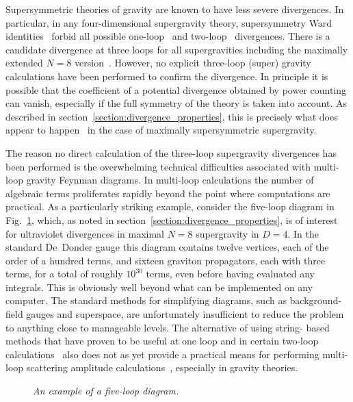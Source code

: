 \documentclass[12pt]{livrev}
\begin{document}
Supersymmetric theories of gravity are known to have less severe
divergences. In particular, in any four-dimensional supergravity
theory, supersymmetry Ward
identities~\cite{Grisaru77SWIA,Grisaru77SWIB} forbid all possible
one-loop~\cite{OneLoopSUGRA} and two-loop~\cite{Grisaru77,Tomboulis77}
divergences.  There is a candidate divergence at three loops for all
supergravities including the maximally extended $N=8$
version~\cite{Deser77,Howe81,KalloshNeight,Howe89}.  However, no
explicit three-loop (super) gravity calculations have been performed
to confirm the divergence.  In principle it is possible that the coefficient
of a potential divergence obtained by power counting can vanish,
especially if the full symmetry of the theory is taken into account.
As described in section~\ref{section:divergence_properties}, this is
precisely what does appear to happen~\cite{BDDPR,Stelle} in the case
of maximally supersymmetric supergravity.

The reason no direct calculation of the three-loop supergravity
divergences has been performed is the overwhelming technical
difficulties associated with multi-loop gravity Feynman diagrams.  In
multi-loop calculations the number of algebraic terms proliferates
rapidly beyond the point where computations are practical.  As a
particularly striking example, consider the five-loop diagram in
Fig.~\ref{figure:Multiloop}, which, as noted in
section~\ref{section:divergence_properties}, is of interest for
ultraviolet divergences in maximal $N=8$ supergravity in $D=4$.  In
the standard De~Donder gauge this diagram contains twelve vertices,
each of the order of a hundred terms, and sixteen graviton
propagators, each with three terms, for a total of roughly $10^{30}$
terms, even before having evaluated any integrals.  This is obviously
well beyond what can be implemented on any computer. The standard
methods for simplifying diagrams, such as background-field gauges and
superspace, are unfortunately insufficient to reduce the problem to
anything close to manageable levels. The alternative of using string-
based methods that have proven to be useful at one loop and in
certain two-loop
calculations~\cite{Long,BDS,Schmidt94,DunbarNorridge95,DunbarNorridge97,
Dunbar02,Schubert01} also does not as yet provide a practical means
for performing multi-loop scattering amplitude
calculations~\cite{Roland92,Roland96,DiVecchia96,Roland98,Frizzo00},
especially in gravity theories.


\begin{figure}[h]
  \def\epsfsize#1#2{0.3#1}
  \centerline{}
  \caption{\it An example of a five-loop diagram.}
  \label{figure:Multiloop}
\end{figure}
\end{document}
